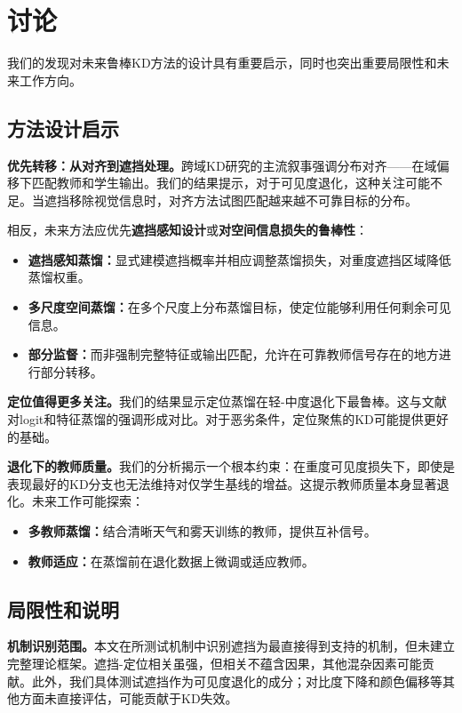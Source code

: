 \section{讨论}
\label{sec:discussion}

我们的发现对未来鲁棒KD方法的设计具有重要启示，同时也突出重要局限性和未来工作方向。

\subsection{方法设计启示}

\textbf{优先转移：从对齐到遮挡处理。}跨域KD研究的主流叙事强调分布对齐——在域偏移下匹配教师和学生输出。我们的结果提示，对于可见度退化，这种关注可能不足。当遮挡移除视觉信息时，对齐方法试图匹配越来越不可靠目标的分布。

相反，未来方法应优先\textbf{遮挡感知设计}或\textbf{对空间信息损失的鲁棒性}：
\begin{itemize}
    \item \textbf{遮挡感知蒸馏：}显式建模遮挡概率并相应调整蒸馏损失，对重度遮挡区域降低蒸馏权重。
    \item \textbf{多尺度空间蒸馏：}在多个尺度上分布蒸馏目标，使定位能够利用任何剩余可见信息。
    \item \textbf{部分监督：}而非强制完整特征或输出匹配，允许在可靠教师信号存在的地方进行部分转移。
\end{itemize}

\textbf{定位值得更多关注。}我们的结果显示定位蒸馏在轻-中度退化下最鲁棒。这与文献对logit和特征蒸馏的强调形成对比。对于恶劣条件，定位聚焦的KD可能提供更好的基础。

\textbf{退化下的教师质量。}我们的分析揭示一个根本约束：在重度可见度损失下，即使是表现最好的KD分支也无法维持对仅学生基线的增益。这提示教师质量本身显著退化。未来工作可能探索：
\begin{itemize}
    \item \textbf{多教师蒸馏：}结合清晰天气和雾天训练的教师，提供互补信号。
    \item \textbf{教师适应：}在蒸馏前在退化数据上微调或适应教师。
\end{itemize}

\subsection{局限性和说明}

\textbf{机制识别范围。}本文在所测试机制中识别遮挡为最直接得到支持的机制，但未建立完整理论框架。遮挡-定位相关虽强，但相关不蕴含因果，其他混杂因素可能贡献。此外，我们具体测试遮挡作为可见度退化的成分；对比度下降和颜色偏移等其他方面未直接评估，可能贡献于KD失效。

